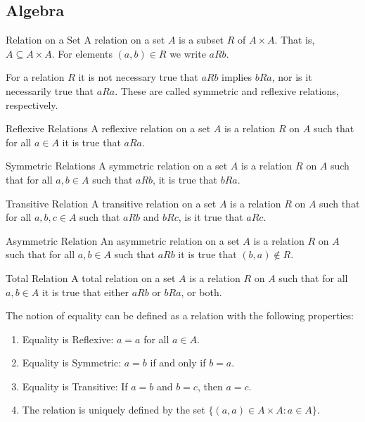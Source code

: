 \documentclass[crop=false,class=book,oneside]{standalone}
\begin{document}
    \subsection{Algebra}
        \begin{ldefinition}{Relation on a Set}
            A relation on a set $A$ is a subset $R$ of $A\times{A}$.
            That is, $A\subseteq{A}\times{A}$. For elements $(a,b)\in{R}$
            we write $aRb$.
        \end{ldefinition}
        For a relation $R$ it is not necessary true that $aRb$ implies
        $bRa$, nor is it necessarily true that $aRa$. These are called
        symmetric and reflexive relations, respectively.
        \begin{ldefinition}{Reflexive Relations}
            A reflexive relation on a set $A$ is a relation $R$ on $A$ such that
            for all $a\in{A}$ it is true that $aRa$.
        \end{ldefinition}
        \begin{ldefinition}{Symmetric Relations}
            A symmetric relation on a set $A$ is a relation $R$ on $A$ such
            that for all $a,b\in{A}$ such that $aRb$, it is true that
            $bRa$.
        \end{ldefinition}
        \begin{ldefinition}{Transitive Relation}
            A transitive relation on a set $A$ is a relation $R$ on $A$
            such that for all $a,b,c\in{A}$ such that $aRb$ and $bRc$,
            is it true that $aRc$.
        \end{ldefinition}
        \begin{ldefinition}{Asymmetric Relation}
            An asymmetric relation on a set $A$ is a relation $R$ on $A$ such
            that for all $a,b\in{A}$ such that $aRb$ it is true that
            $(b,a)\notin{R}$.
        \end{ldefinition}
        \begin{ldefinition}{Total Relation}
            A total relation on a set $A$ is a relation $R$ on $A$ such
            that for all $a,b\in{A}$ it is true that either
            $aRb$ or $bRa$, or both.
        \end{ldefinition}
        The notion of equality can be defined as a relation
        with the following properties:
        \begin{enumerate}
            \item Equality is Reflexive: $a=a$ for all $a\in{A}$.
            \item Equality is Symmetric: $a=b$ if and only if $b=a$.
            \item Equality is Transitive: If $a=b$ and $b=c$, then $a=c$.
            \item The relation is uniquely defined by the set
                  $\{(a,a)\in A\times A:a\in A\}$.
        \end{enumerate}
\end{document}
